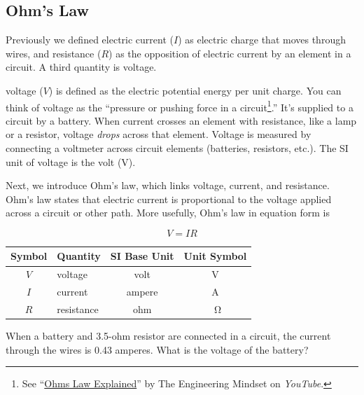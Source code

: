 \documentclass[dvipsnames]{article}
\numberwithin{equation}{section}
\numberwithin{figure}{section}
\begin{document}
\clearpage

\subsection{Ohm's Law} \label{nJeAQY}

Previously we defined \gls{electric current} ($I$) as electric charge that moves through wires, and \gls{resistance} ($R$) as the opposition of electric current by an element in a circuit. A third quantity is voltage.

\vspace{1em}

\Gls{voltage} ($V$) is defined as the electric potential energy per unit charge. You can think of voltage as the ``pressure or pushing force in a circuit\footnote{See ``\href{https://youtu.be/HsLLq6Rm5tU?t=291}{Ohms Law Explained}'' by The Engineering Mindset on \textit{YouTube}.}.'' It's supplied to a circuit by a battery. When current crosses an element with resistance, like a lamp or a resistor, voltage \textit{drops} across that element. Voltage is measured by connecting a voltmeter across circuit elements (batteries, resistors, etc.). The SI unit of voltage is the volt (V). 

\vspace{1em}

Next, we introduce Ohm's law, which links voltage, current, and resistance. \gls{Ohm's law} states that electric current is proportional to the voltage applied across a circuit or other path. More usefully, Ohm's law in equation form is

\begin{equation} \label{cS0E6k}
    V = IR
\end{equation}

\begin{center}
    \begin{tabular}{cl|cc}
    \hline
    \textbf{Symbol} & \textbf{Quantity} & \textbf{SI Base Unit} & \textbf{Unit Symbol}  \\
    \hline\hline
    \rule{0pt}{2.5ex}
        $V$ & voltage & volt & V\\
        $I$ & current & ampere & A\\
        $R$ & resistance & ohm & \qty{}{\ohm}\\
    \hline
    \end{tabular}
\end{center}

\cyanhrule

\begin{example}
    When a battery and 3.5-ohm resistor are connected in a circuit, the current through the wires is 0.43 amperes. What is the voltage of the battery?
\end{example}
\end{document}
